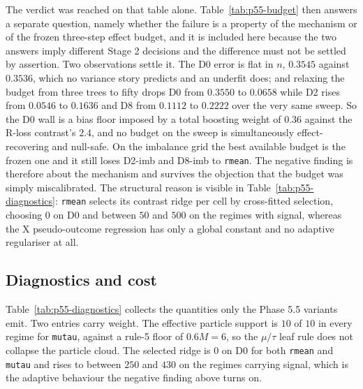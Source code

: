The verdict was reached on that table alone. Table~\ref{tab:p55-budget} then
answers a separate question, namely whether the failure is a property of the
mechanism or of the frozen three-step effect budget, and it is included here
because the two answers imply different Stage 2 decisions and the difference
must not be settled by assertion. Two observations settle it. The D0 error is
flat in $n$, $0.3545$ against $0.3536$, which no variance story predicts and an
underfit does; and relaxing the budget from three trees to fifty drops D0 from
$0.3550$ to $0.0658$ while D2 rises from $0.0546$ to $0.1636$ and D8 from
$0.1112$ to $0.2222$ over the very same sweep. So the D0 wall is a bias floor
imposed by a total boosting weight of $0.36$ against the R-loss contrast's
$2.4$, and no budget on the sweep is simultaneously effect-recovering and
null-safe. On the imbalance grid the best available budget is the frozen one and
it still loses D2-imb and D8-imb to \texttt{rmean}. The negative finding is
therefore about the mechanism and survives the objection that the budget was
simply miscalibrated. The structural reason is visible in
Table~\ref{tab:p55-diagnostics}: \texttt{rmean} selects its contrast ridge per
cell by cross-fitted selection, choosing $0$ on D0 and between $50$ and $500$
on the regimes with signal, whereas the X pseudo-outcome regression has only a
global constant and no adaptive regulariser at all.

\subsection{Diagnostics and cost}
\label{sub:p55cost}

Table~\ref{tab:p55-diagnostics} collects the quantities only the Phase 5.5
variants emit. Two entries carry weight. The effective particle support is
$10$ of $10$ in every regime for \texttt{mutau}, against a rule-5 floor of
$0.6M = 6$, so the $\mu/\tau$ leaf rule does not collapse the particle cloud.
The selected ridge is $0$ on D0 for both \texttt{rmean} and \texttt{mutau} and
rises to between $250$ and $430$ on the regimes carrying signal, which is the
adaptive behaviour the negative finding above turns on.

